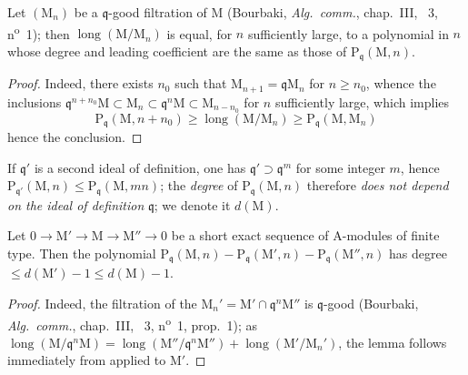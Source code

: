 
\begin{lemma}[16.2.2.1]
\label{0.16.2.2.1}
Let $(\mathrm{M}_n)$ be a $\mathfrak{q}$-good filtration of $\mathrm{M}$ (Bourbaki, \emph{Alg.~comm.}, chap.~III, \textsection~3, n\textsuperscript{o}~1); then $\operatorname{long}(\mathrm{M}/\mathrm{M}_n)$ is equal, for $n$ sufficiently large, to a polynomial in $n$ whose degree and leading coefficient are the same as those of $\mathrm{P}_\mathfrak{q}(\mathrm{M},n)$.
\end{lemma}

\begin{proof}
Indeed, there exists $n_0$ such that $\mathrm{M}_{n+1}=\mathfrak{q}\mathrm{M}_n$ for $n\geq n_0$, whence the inclusions $\mathfrak{q}^{n+n_0}\mathrm{M}\subset\mathrm{M}_n\subset\mathfrak{q}^n\mathrm{M}\subset\mathrm{M}_{n-n_0}$ for $n$ sufficiently large, which implies
\[
  \mathrm{P}_\mathfrak{q}(\mathrm{M},n+n_0)\geq\operatorname{long}(\mathrm{M}/\mathrm{M}_n)\geq\mathrm{P}_\mathfrak{q}(\mathrm{M},\mathrm{M}_n)
\]
hence the conclusion.
\end{proof}

If $\mathfrak{q}'$ is a second ideal of definition, one has $\mathfrak{q}'\supset\mathfrak{q}^m$ for some integer $m$, hence $\mathrm{P}_{\mathfrak{q}'}(\mathrm{M},n)\leq\mathrm{P}_\mathfrak{q}(\mathrm{M},mn)$; the \emph{degree} of $\mathrm{P}_\mathfrak{q}(\mathrm{M},n)$ therefore \emph{does not depend on the ideal of definition} $\mathfrak{q}$; we denote it $d(\mathrm{M})$.

\begin{lemma}[16.2.2.2]
\label{0.16.2.2.2}
Let $0\to\mathrm{M}'\to\mathrm{M}\to\mathrm{M}''\to 0$ be a short exact sequence of $\mathrm{A}$-modules of finite type.
Then the polynomial $\mathrm{P}_\mathfrak{q}(\mathrm{M},n)-\mathrm{P}_\mathfrak{q}(\mathrm{M}',n)-\mathrm{P}_\mathfrak{q}(\mathrm{M}'',n)$ has degree $\leq d(\mathrm{M}')-1\leq d(\mathrm{M})-1$.
\end{lemma}

\begin{proof}
Indeed, the filtration of the $\mathrm{M}_n'=\mathrm{M}'\cap\mathfrak{q}^n\mathrm{M}''$ is $\mathfrak{q}$-good (Bourbaki, \emph{Alg.~comm.}, chap.~III, \textsection~3, n\textsuperscript{o}~1, prop.~1); as $\operatorname{long}(\mathrm{M}/\mathfrak{q}^n\mathrm{M})=\operatorname{long}(\mathrm{M}''/\mathfrak{q}^n\mathrm{M}'')+\operatorname{long}(\mathrm{M}'/\mathrm{M}_n')$, the lemma follows immediately from  applied to $\mathrm{M}'$.
\end{proof}

